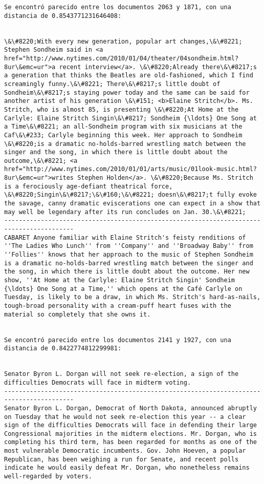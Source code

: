 \documentclass[11pt]{article}
\begin{document}
\begin{Verbatim}[commandchars=\\\{\}]
Se encontró parecido entre los documentos 2063 y 1871, con una distancia de 0.8543771231646408:


\&\#8220;With every new generation, popular art changes,\&\#8221; Stephen Sondheim said in <a href="http://www.nytimes.com/2010/01/04/theater/04sondheim.html?8ur\&emc=ur">a recent interview</a>. \&\#8220;Already there\&\#8217;s a generation that thinks the Beatles are old-fashioned, which I find screamingly funny.\&\#8221; There\&\#8217;s little doubt of Sondheim\&\#8217;s staying power today and the same can be said for another artist of his generation \&\#151; <b>Elaine Stritch</b>. Ms. Stritch, who is almost 85, is presenting \&\#8220;At Home at the Carlyle: Elaine Stritch Singin\&\#8217; Sondheim {\ldots} One Song at a Time\&\#8221; an all-Sondheim program with six musicians at the Caf\&\#233; Carlyle beginning this week. Her approach to Sondheim \&\#8220;is a dramatic no-holds-barred wrestling match between the singer and the song, in which there is little doubt about the outcome,\&\#8221; <a href="http://www.nytimes.com/2010/01/01/arts/music/01look-music.html?8ur\&emc=ur">writes Stephen Holden</a>. \&\#8220;Because Ms. Stritch is a ferociously age-defiant theatrical force, \&\#8220;Singin\&\#8217;\&\#160;\&\#8221; doesn\&\#8217;t fully evoke the savage, canny dramatic eviscerations one can expect in a show that may well be legendary after its run concludes on Jan. 30.\&\#8221; 
-----------------------------------------------------------------------------------------
CABARET Anyone familiar with Elaine Stritch's feisty renditions of ''The Ladies Who Lunch'' from ''Company'' and ''Broadway Baby'' from ''Follies'' knows that her approach to the music of Stephen Sondheim is a dramatic no-holds-barred wrestling match between the singer and the song, in which there is little doubt about the outcome. Her new show, ''At Home at the Carlyle: Elaine Stritch Singin' Sondheim {\ldots} One Song at a Time,'' which opens at the Café Carlyle on Tuesday, is likely to be a draw, in which Ms. Stritch's hard-as-nails, tough-broad personality with a cream-puff heart fuses with the material so completely that she owns it.


Se encontró parecido entre los documentos 2141 y 1927, con una distancia de 0.8422774812299981:


Senator Byron L. Dorgan will not seek re-election, a sign of the difficulties Democrats will face in midterm voting.
-----------------------------------------------------------------------------------------
Senator Byron L. Dorgan, Democrat of North Dakota, announced abruptly on Tuesday that he would not seek re-election this year -- a clear sign of the difficulties Democrats will face in defending their large Congressional majorities in the midterm elections. Mr. Dorgan, who is completing his third term, has been regarded for months as one of the most vulnerable Democratic incumbents. Gov. John Hoeven, a popular Republican, has been weighing a run for Senate, and recent polls indicate he would easily defeat Mr. Dorgan, who nonetheless remains well-regarded by voters.



\end{Verbatim}
\end{document}
